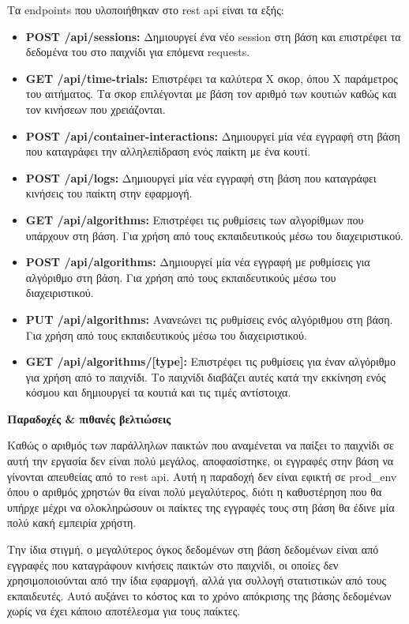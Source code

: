 Τα \glspl{endpoint} που υλοποιήθηκαν στο \acrshort{rest} \acrshort{api} είναι τα εξής:
\begin{itemize}
    \item \textbf{POST /api/sessions:} Δημιουργεί ένα νέο session στη βάση και επιστρέφει τα δεδομένα του στο παιχνίδι για επόμενα requests.
    \item \textbf{GET /api/time-trials:} Επιστρέφει τα καλύτερα Χ σκορ, όπου Χ παράμετρος του αιτήματος. Τα σκορ επιλέγονται με βάση τον αριθμό των κουτιών καθώς και τον κινήσεων που χρειάζονται.
    \item \textbf{POST /api/container-interactions:} Δημιουργεί μία νέα εγγραφή στη βάση που καταγράφει την αλληλεπίδραση ενός παίκτη με ένα κουτί.
    \item \textbf{POST /api/logs:} Δημιουργεί μία νέα εγγραφή στη βάση που καταγράφει κινήσεις του παίκτη στην εφαρμογή.
    \item \textbf{GET /api/algorithms:} Επιστρέφει τις ρυθμίσεις των αλγορίθμων που υπάρχουν στη βάση. Για χρήση από τους εκπαιδευτικούς μέσω του διαχειριστικού.
    \item \textbf{POST /api/algorithms:} Δημιουργεί μία νέα εγγραφή με ρυθμίσεις για αλγόριθμο στη βάση. Για χρήση από τους εκπαιδευτικούς μέσω του διαχειριστικού.
    \item \textbf{PUT /api/algorithms:} Ανανεώνει τις ρυθμίσεις ενός αλγόριθμου στη βάση. Για χρήση από τους εκπαιδευτικούς μέσω του διαχειριστικού.
    \item \textbf{GET /api/algorithms/[type]:} Επιστρέφει τις ρυθμίσεις για έναν αλγόριθμο για χρήση από το παιχνίδι. Το παιχνίδι διαβάζει αυτές κατά την εκκίνηση ενός κόσμου και δημιουργεί τα κουτιά και τις τιμές αντίστοιχα.
\end{itemize}

\textbf{Παραδοχές \& πιθανές βελτιώσεις}

Καθώς ο αριθμός των παράλληλων παικτών που αναμένεται να παίξει το παιχνίδι σε αυτή την εργασία δεν είναι πολύ μεγάλος, αποφασίστηκε, οι εγγραφές στην βάση να γίνονται απευθείας από το \acrshort{rest} \acrshort{api}. Αυτή η παραδοχή δεν είναι εφικτή σε \gls{prod_env} όπου ο αριθμός χρηστών θα είναι πολύ μεγαλύτερος, διότι η καθυστέρηση που θα υπήρχε μέχρι να ολοκληρώσουν οι παίκτες της εγγραφές τους στη βάση θα έδινε μία πολύ κακή εμπειρία χρήστη.

Την ίδια στιγμή, ο μεγαλύτερος όγκος δεδομένων στη βάση δεδομένων είναι από εγγραφές που καταγράφουν κινήσεις παικτών στο παιχνίδι, οι οποίες δεν χρησιμοποιούνται από την ίδια εφαρμογή, αλλά για συλλογή στατιστικών από τους εκπαιδευτές. Αυτό αυξάνει το κόστος και το χρόνο απόκρισης της βάσης δεδομένων χωρίς να έχει κάποιο αποτέλεσμα για τους παίκτες.

